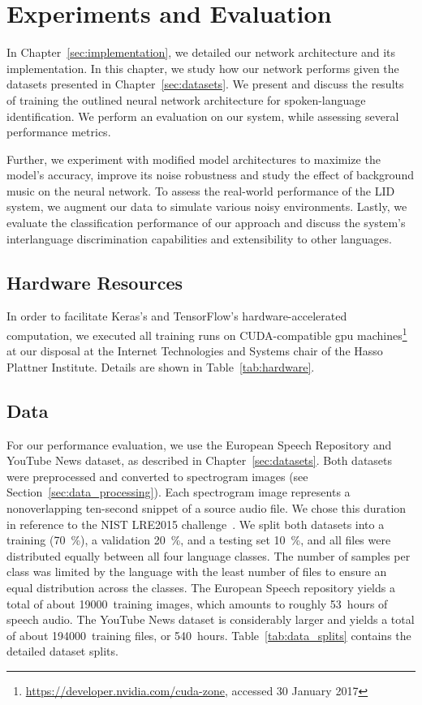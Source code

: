 \section{Experiments and Evaluation}
\label{sec:evaluation}
In Chapter~\ref{sec:implementation}, we detailed our network architecture and its implementation. In this chapter, we study how our network performs given the datasets presented in Chapter~\ref{sec:datasets}. We present and discuss the results of training the outlined neural network architecture for spoken-language identification. We perform an evaluation on our system, while assessing several performance metrics.

Further, we experiment with modified model architectures to maximize the model's accuracy, improve its noise robustness and study the effect of background music on the neural network. To assess the real-world performance of the LID system, we augment our data to simulate various noisy environments. Lastly, we evaluate the classification performance of our approach and discuss the system's interlanguage discrimination capabilities and extensibility to other languages.

\subsection{Hardware Resources}
\label{sec:hardware}
	In order to facilitate Keras's and TensorFlow's hardware-accelerated computation, we executed all training runs on CUDA-compatible \ac{gpu} machines\footnote{\url{https://developer.nvidia.com/cuda-zone}, accessed 30 January 2017} at our disposal at the Internet Technologies and Systems chair of the Hasso Plattner Institute. Details are shown in Table~\ref{tab:hardware}.




\subsection{Data}
\label{sec:data}
	For our performance evaluation, we use the European Speech Repository and YouTube News dataset, as described in Chapter~\ref{sec:datasets}. Both datasets were preprocessed and converted to spectrogram images (see Section~\ref{sec:data_processing}). Each spectrogram image represents a nonoverlapping ten-second snippet of a source audio file. We chose this duration in reference to the NIST LRE2015 challenge~\cite{lre2015}. We split both datasets into a training (\SI{70}{\percent}), a validation \SI{20}{\percent}, and a testing set \SI{10}{\percent}, and all files were distributed equally between all four language classes. The number of samples per class was limited by the language with the least number of files to ensure an equal distribution across the classes. The European Speech repository yields a total of about \num{19000}~training images, which amounts to roughly \num{53}~hours of speech audio. The YouTube News dataset is considerably larger and yields a total of about \num{194000}~training files, or \num{540}~hours. Table~\ref{tab:data_splits} contains the detailed dataset splits.

